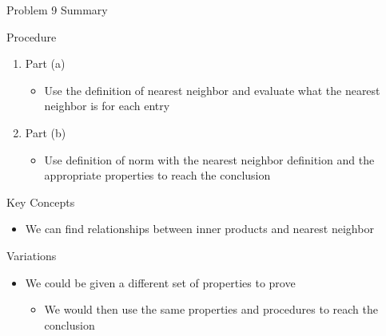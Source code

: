 \begin{summary}{Problem 9 Summary}
    \begin{statement}{Procedure}
        \begin{enumerate}[label = (\alph*)]
            \item Part (a)
            \begin{itemize}
                \item Use the definition of nearest neighbor and evaluate what the nearest neighbor is for each entry
            \end{itemize}
            \item Part (b)
            \begin{itemize}
                \item Use definition of norm with the nearest neighbor definition and the appropriate properties to reach the conclusion
            \end{itemize}
        \end{enumerate}
    \end{statement}
    \begin{statement}{Key Concepts}
        \begin{itemize}
            \item We can find relationships between inner products and nearest neighbor
        \end{itemize}
    \end{statement}
    \begin{statement}{Variations}
        \begin{itemize}
            \item We could be given a different set of properties to prove
            \begin{itemize}
                \item We would then use the same properties and procedures to reach the conclusion
            \end{itemize}
        \end{itemize}
    \end{statement}
\end{summary}